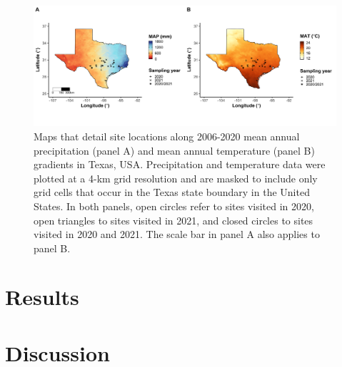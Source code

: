    \newpage
    \begin{landscape}
        \begin{figure}
            \centering
            \includegraphics[scale = 0.05]{ch4_TXeco/figs/TXeco_fig1_site_map.png}
            \caption[Maps that detail site locations along 2006-2020 mean annual precipitation (panel A) and mean annual temperature (panel B) gradients in Texas, USA.]{Maps that detail site locations along 2006-2020 mean annual precipitation (panel A) and mean annual temperature (panel B) gradients in Texas, USA. Precipitation and temperature data were plotted at a 4-km grid resolution and are masked to include only grid cells that occur in the Texas state boundary in the United States. In both panels, open circles refer to sites visited in 2020, open triangles to sites visited in 2021, and closed circles to sites visited in 2020 and 2021. The scale bar in panel A also applies to panel B.}
            \label{fig:figure4.1}
        \end{figure}
    \end{landscape}
    \clearpage









    \section{Results}

    \section{Discussion}